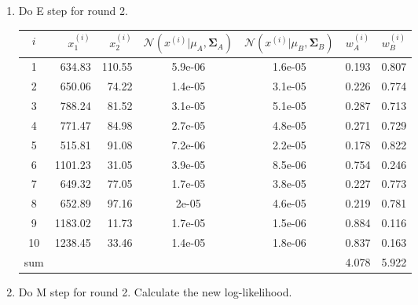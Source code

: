 \begin{enumerate}
\vspace{10mm}

\item Do E step for round 2.

\begin{center}
\small
\begin{tabular}{crrcccc}
\toprule
$i$ & $x_1^{(i)}$ & $x_2^{(i)}$ & $\mathcal{N}(x^{(i)}| \mu_A, \boldsymbol\Sigma_A)$ & $\mathcal{N}(x^{(i)}|\mu_B, \boldsymbol\Sigma_B)$ & $w_A^{(i)}$ & $w_B^{(i)}$ \\
\midrule
1 & 634.83 & 110.55 & 5.9e-06 & 1.6e-05 & 0.193 & 0.807 \\ 
  2 & 650.06 & 74.22 & 1.4e-05 & 3.1e-05 & 0.226 & 0.774 \\ 
  3 & 788.24 & 81.52 & 3.1e-05 & 5.1e-05 & 0.287 & 0.713 \\ 
  4 & 771.47 & 84.98 & 2.7e-05 & 4.8e-05 & 0.271 & 0.729 \\ 
  5 & 515.81 & 91.08 & 7.2e-06 & 2.2e-05 & 0.178 & 0.822 \\ 
  6 & 1101.23 & 31.05 & 3.9e-05 & 8.5e-06 & 0.754 & 0.246 \\ 
  7 & 649.32 & 77.05 & 1.7e-05 & 3.8e-05 & 0.227 & 0.773 \\ 
  8 & 652.89 & 97.16 & 2e-05 & 4.6e-05 & 0.219 & 0.781 \\ 
  9 & 1183.02 & 11.73 & 1.7e-05 & 1.5e-06 & 0.884 & 0.116 \\ 
  10 & 1238.45 & 33.46 & 1.4e-05 & 1.8e-06 & 0.837 & 0.163 \\ 
\midrule
sum & & & & & 4.078 & 5.922 \\
\bottomrule
\end{tabular}
\end{center}

\newpage

\item Do M step for round 2. Calculate the new log-likelihood.


\end{enumerate}
